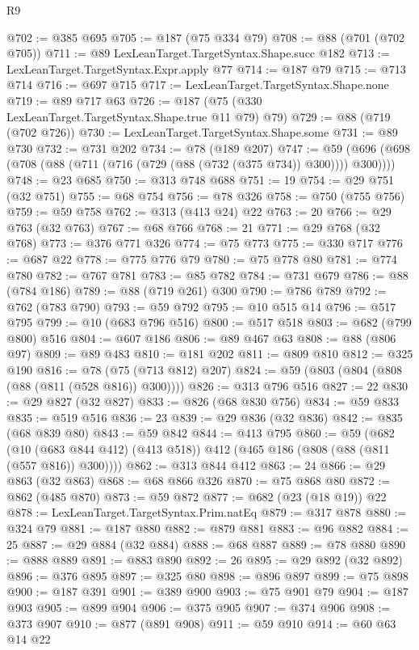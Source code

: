 \begin{lexlean}{R9}
\begin{coremodule}
@702 := @385 @695
@705 := @187 (@75 @334 @79)
@708 := @88 (@701 (@702 @705))
@711 := @89 LexLeanTarget.TargetSyntax.Shape.succ @182
@713 := LexLeanTarget.TargetSyntax.Expr.apply @77
@714 := @187 @79
@715 := @713 @714
@716 := @697 @715
@717 := LexLeanTarget.TargetSyntax.Shape.none
@719 := @89 @717 @63
@726 := @187 (@75 (@330 LexLeanTarget.TargetSyntax.Shape.true @11 @79) @79)
@729 := @88 (@719 (@702 @726))
@730 := LexLeanTarget.TargetSyntax.Shape.some
@731 := @89 @730
@732 := @731 @202
@734 := @78 (@189 @207)
@747 := @59 (@696 (@698 (@708 (@88 (@711 (@716 (@729 (@88 (@732 (@375 @734)) @300)))) @300))))
@748 := @23 @685
@750 := @313 @748 @688
@751 := 19
@754 := @29 @751 (@32 @751)
@755 := @68 @754
@756 := @78 @326
@758 := @750 (@755 @756)
@759 := @59 @758
@762 := @313 (@413 @24) @22
@763 := 20
@766 := @29 @763 (@32 @763)
@767 := @68 @766
@768 := 21
@771 := @29 @768 (@32 @768)
@773 := @376 @771 @326
@774 := @75 @773
@775 := @330 @717
@776 := @687 @22
@778 := @775 @776 @79
@780 := @75 @778 @80
@781 := @774 @780
@782 := @767 @781
@783 := @85 @782
@784 := @731 @679
@786 := @88 (@784 @186)
@789 := @88 (@719 @261) @300
@790 := @786 @789
@792 := @762 (@783 @790)
@793 := @59 @792
@795 := @10 @515 @14
@796 := @517 @795
@799 := @10 (@683 @796 @516)
@800 := @517 @518
@803 := @682 (@799 @800) @516
@804 := @607 @186
@806 := @89 @467 @63
@808 := @88 (@806 @97)
@809 := @89 @483
@810 := @181 @202
@811 := @809 @810
@812 := @325 @190
@816 := @78 (@75 (@713 @812) @207)
@824 := @59 (@803 (@804 (@808 (@88 (@811 (@528 @816)) @300))))
@826 := @313 @796 @516
@827 := 22
@830 := @29 @827 (@32 @827)
@833 := @826 (@68 @830 @756)
@834 := @59 @833
@835 := @519 @516
@836 := 23
@839 := @29 @836 (@32 @836)
@842 := @835 (@68 @839 @80)
@843 := @59 @842
@844 := @413 @795
@860 := @59
    (@682 (@10 (@683 @844 @412) (@413 @518)) @412 (@465 @186 (@808 (@88 (@811 (@557 @816)) @300))))
@862 := @313 @844 @412
@863 := 24
@866 := @29 @863 (@32 @863)
@868 := @68 @866 @326
@870 := @75 @868 @80
@872 := @862 (@485 @870)
@873 := @59 @872
@877 := @682 (@23 (@18 @19)) @22
@878 := LexLeanTarget.TargetSyntax.Prim.natEq
@879 := @317 @878
@880 := @324 @79
@881 := @187 @880
@882 := @879 @881
@883 := @96 @882
@884 := 25
@887 := @29 @884 (@32 @884)
@888 := @68 @887
@889 := @78 @880
@890 := @888 @889
@891 := @883 @890
@892 := 26
@895 := @29 @892 (@32 @892)
@896 := @376 @895
@897 := @325 @80
@898 := @896 @897
@899 := @75 @898
@900 := @187 @391
@901 := @389 @900
@903 := @75 @901 @79
@904 := @187 @903
@905 := @899 @904
@906 := @375 @905
@907 := @374 @906
@908 := @373 @907
@910 := @877 (@891 @908)
@911 := @59 @910
@914 := @60 @63 @14 @22

\end{coremodule}
\end{lexlean}
